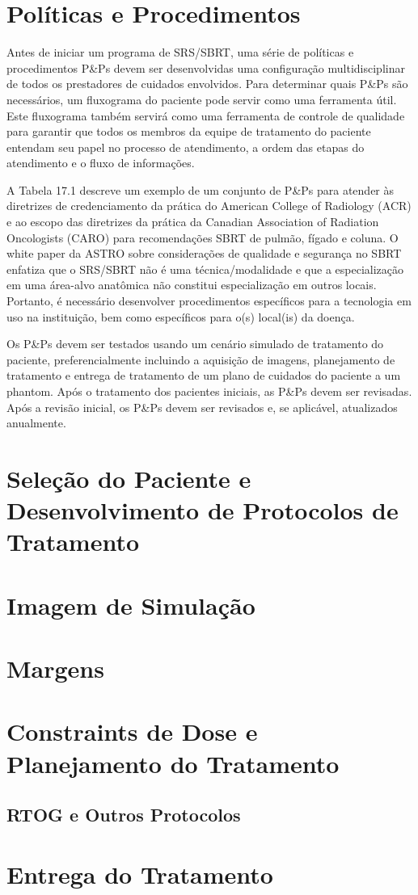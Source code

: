 \documentclass[11pt,a4paper]{article}
\newcounter{exemplo}
\begin{document}
\section{Políticas e Procedimentos}

	Antes de iniciar um programa de SRS/SBRT, uma série de políticas e procedimentos P\&Ps devem ser desenvolvidas uma configuração multidisciplinar de todos os prestadores de cuidados envolvidos. Para determinar quais P\&Ps são necessários, um fluxograma do paciente pode servir como uma ferramenta útil. Este fluxograma também servirá como uma ferramenta de controle de qualidade para garantir que todos os membros da equipe de tratamento do paciente entendam seu papel no processo de atendimento, a ordem das etapas do atendimento e o fluxo de informações.

	A Tabela 17.1 descreve um exemplo de um conjunto de P&Ps para atender às diretrizes de credenciamento da prática do American College of Radiology (ACR) e ao escopo das diretrizes da prática da Canadian Association of Radiation Oncologists (CARO) para recomendações SBRT de pulmão, fígado e coluna. O white paper da ASTRO sobre considerações de qualidade e segurança no SBRT enfatiza que o SRS/SBRT não é uma técnica/modalidade e que a especialização em uma área-alvo anatômica não constitui especialização em outros locais. Portanto, é necessário desenvolver procedimentos específicos para a tecnologia em uso na instituição, bem como específicos para o(s) local(is) da doença. 

	Os P\&Ps devem ser testados usando um cenário simulado de tratamento do paciente, preferencialmente incluindo a aquisição de imagens, planejamento de tratamento e entrega de tratamento de um plano de cuidados do paciente a um phantom. Após o tratamento dos pacientes iniciais, as P\&Ps devem ser revisadas. Após a revisão inicial, os P\&Ps devem ser revisados e, se aplicável, atualizados anualmente.

\section{Seleção do Paciente e Desenvolvimento de Protocolos de Tratamento}



\section{Imagem de Simulação}


\section{Margens}


\section{Constraints de Dose e Planejamento do Tratamento}

\subsection*{RTOG e Outros Protocolos}

\section{Entrega do Tratamento}




\end{document}
